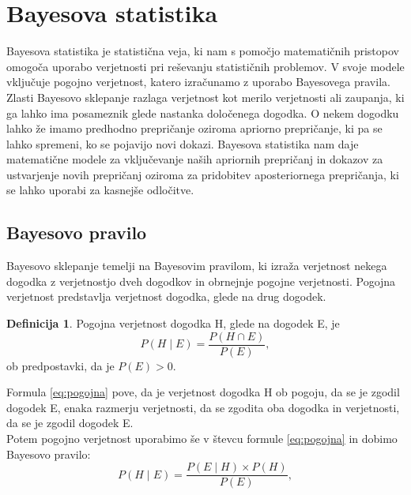 \documentclass[12pt,a4paper]{amsart}
\theoremstyle{definition} %
\newtheorem{definicija}{Definicija}[section]
\theoremstyle{plain} %
\begin{document}
\section{Bayesova statistika}
Bayesova statistika je statistična veja, ki nam s pomočjo matematičnih pristopov omogoča uporabo verjetnosti pri reševanju statističnih 
problemov. V svoje modele vključuje pogojno verjetnost, katero izračunamo z uporabo Bayesovega pravila. \\

Zlasti Bayesovo sklepanje razlaga verjetnost kot merilo verjetnosti ali zaupanja, ki ga lahko ima posameznik glede nastanka določenega dogodka. 
O nekem dogodku lahko že imamo predhodno prepričanje oziroma apriorno prepričanje, ki pa se lahko spremeni, ko se pojavijo novi dokazi. Bayesova 
statistika nam daje matematične modele za vključevanje naših apriornih prepričanj in dokazov za ustvarjenje novih prepričanj oziroma za 
pridobitev aposteriornega prepričanja, ki se lahko uporabi za kasnejše odločitve.

\subsection{Bayesovo pravilo} 
Bayesovo sklepanje temelji na Bayesovim pravilom, ki izraža verjetnost nekega dogodka z verjetnostjo dveh dogodkov in obrnejnje pogojne 
verjetnosti. Pogojna verjetnost predstavlja verjetnost dogodka, glede na drug dogodek. 

\begin{definicija}
Pogojna verjetnost dogodka H, glede na dogodek E, je
\begin{equation}\label{eq:pogojna}
P(H \mid E) = \frac{P(H \cap E)}{P(E)},
\end{equation}
ob predpostavki, da je $P(E) > 0$.
\end{definicija}

Formula \eqref{eq:pogojna} pove, da je verjetnost dogodka H ob pogoju, da se je zgodil dogodek E, enaka razmerju verjetnosti, da se 
zgodita oba dogodka in verjetnosti, da se je zgodil dogodek E.\\

Potem pogojno verjetnost uporabimo še v števcu formule \eqref{eq:pogojna} in dobimo Bayesovo pravilo:
\begin{equation}\label{eq:bpravilo}
    P(H \mid E) = \frac{P(E \mid H) \times P(H)}{P(E)},
\end{equation}
\end{document}
